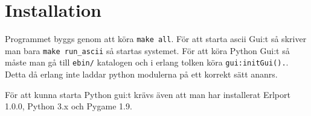 
\chapter{Installation}

\label{Installation} 


Programmet byggs genom att köra \verb+make all+.
För att starta ascii Gui:t så skriver man bara \verb+make run_ascii+ så startas systemet.
För att köra Python Gui:t så måste man gå till  \verb+ebin/+ katalogen och i erlang tolken köra \verb+gui:initGui().+. Detta då erlang inte laddar python modulerna på ett korrekt sätt ananrs.

För att kunna starta Python gui:t krävs även att man har installerat Erlport 1.0.0, Python 3.x och Pygame 1.9.